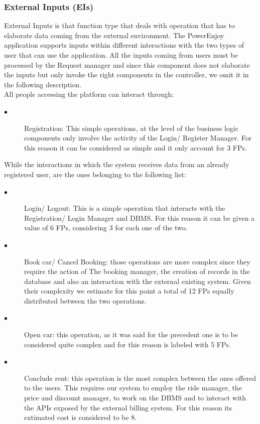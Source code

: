 \documentclass[a4paper,10pt]{article}
\begin{document}
\subsubsection{External Inputs (EIs)} External Inputs is that function type that deals with operation that has to elaborate data coming from
the external environment.
The PowerEnjoy application supports inputs within different interactions with the two types of user
that can use the application. All the inputs coming from users must be processed by the Request manager and since
this component does not elaborate the inputs but only invoke the right components in the controller, we omit it in the following 
description. \\All people accessing the platform can interact through:
\begin{description}
    \item[$\bullet$] Registration: This simple operations, at the level of the business logic components only involve the activity
    of the Login/ Register Manager. For this reason it can be considered as simple and it only account for
    3 FPs.
  \end{description}
 While the interactions in which the system receives data from an already registered user, are the ones belonging to the following list:
 \begin{description}
    \item[$\bullet$] Login/ Logout: This is a simple operation that interacts with the Registration/ Login Manager and DBMS. For this 
    reason it can be given a value of 6 FPs, considering 3 for each one of the two.
    \item[$\bullet$] Book car/ Cancel Booking: those operations are more complex since they require the action of The booking manager,
    the creation of records
    in the database and also an interaction with the external existing system. 
    Given their complexity we estimate for this point a total of 12 FPs equally distributed between the two operations.
    \item[$\bullet$] Open car: this operation, as it was said for the precedent one is to be considered quite complex and for this 
    reason is labeled with 5 FPs.
    \item[$\bullet$] Conclude rent: this operation is the most complex between the ones offered to the users. This requires our
    system to employ the ride manager, the price and discount manager, to work on the DBMS and to interact with the APIs exposed 
    by the external billing system. For this reason its extimated cost is considered to be 8.
  \end{description}
\end{document}
